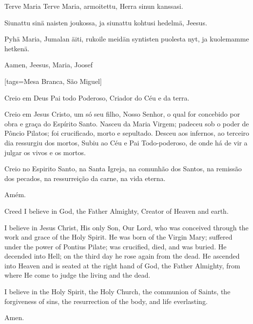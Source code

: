   \begin{passage}[FI]{Terve Maria}
    Terve Maria, armoitettu,
    Herra sinun kanssasi.
    \par
    Siunattu sinä naisten joukossa,
    ja siunattu kohtusi hedelmä, Jeesus.
    \par
    Pyhä Maria, Jumalan äiti, rukoile meidän
    syntisten puolesta nyt, ja kuolemamme hetkenä.
    \par
    Aamen, Jeesus, Maria, Joosef
  \end{passage}
  \vspace*{\fill}
\endsong


[tags={Mesa Branca, São Miguel}]
  \begin{passage}[PT]{}
    Creio em Deus Pai todo Poderoso,
    Criador do Céu e da terra.
    \par
    Creio em Jesus Cristo, um só seu filho, Nosso
    Senhor, o qual for concebido por obra e graça do
    Espírito Santo. Nasceu da Maria Virgem;
    padeceu sob o poder de Pôncio Pilatos;
    foi crucificado, morto e sepultado. Desceu aos
    infernos, ao terceiro dia ressurgiu dos mortos,
    Subiu ao Céu e Pai Todo-poderoso, de onde há de vir
    a julgar os vivos e os mortos.
    \par
    Creio no Espirito Santo, na Santa Igreja,
    na comunhão dos Santos, na remissão
    dos pecados, na ressurreição da carne,
    na vida eterna.
    \par
    Amém.
  \end{passage}
  \hardbrk
  \begin{passage}[EN]{Creed}
    I believe in God, the Father Almighty,
    Creator of Heaven and earth.
    \par
    I believe in Jesus Christ, His only Son, Our Lord,
    who was conceived through the work and grace of
    the Holy Spirit. He was born of the Virgin Mary;
    suffered under the power of Pontius Pilate;
    was crucified, died, and was buried. He decended
    into Hell; on the third day he rose again from
    the dead. He ascended into Heaven and is seated
    at the right hand of God, the Father Almighty, from
    where He come to judge the living and the dead.
    \par
    I believe in the Holy Spirit, the Holy Church,
    the communion of Saints, the forgiveness of sins,
    the resurrection of the body, and life everlasting.
    \par
    Amen.
  \end{passage}
